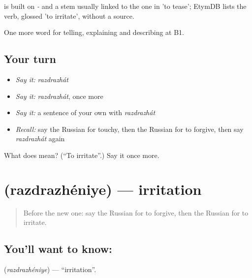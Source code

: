 \begin{cousinweb}
\emph{} is built on \emph{-} and a stem usually linked to the one in \emph{} 'to tease'; EtymDB lists the verb, glossed 'to irritate', without a source.
\end{cousinweb}

\begin{grammarlens}[title={What you've built}]
One more word for telling, explaining and describing at B1.
\end{grammarlens}

\subsection*{Your turn}
\begin{itemize}
\raggedright
  \item \emph{Say it:} \emph{razdrazhát}
  \item \emph{Say it:} \emph{razdrazhát}, once more
  \item \emph{Say it:} a sentence of your own with \emph{razdrazhát}
  \item \emph{Recall:} say the Russian for touchy, then the Russian for to forgive, then say \emph{razdrazhát} again
\end{itemize}

\begin{tcolorbox}[breakable,colback=teal!4,colframe=teal!35!black,title={Before you move on}]
What does  mean? (\textquotedblleft{}To irritate\textquotedblright{}.) Say it once more.
\end{tcolorbox}
\section[\texorpdfstring{\ru{раздражение} (razdrazhéniye)}{раздражение (razdrazhéniye)}]{ (razdrazhéniye) — irritation}

\label{lesson:RU-C472-razdrazheniye}



\begin{quote}
Before the new one: say the Russian for to forgive, then the Russian for to irritate.
\end{quote}

\subsection*{You'll want to know: }
\textbf{} (\emph{razdrazhéniye}) — \textquotedblleft{}irritation\textquotedblright{}.

